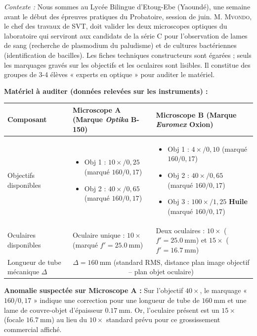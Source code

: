 \documentclass[11pt]{article}
\newcounter{popsec}
\newcounter{popsub}
\newcommand{\courssub}[1]{%
  \stepcounter{popsub}%
  \par\vspace{9pt}\noindent{\popxbold\fontsize{11.5}{13}\selectfont\color{popink}{\color{poporange}\thepopsec.\thepopsub}\hspace{6pt}#1}\par\nopagebreak\vspace{4pt}
}
\begin{document}
\courssub{Situation}
\emph{Contexte :} Nous sommes au Lycée Bilingue d'Etoug-Ebe (Yaoundé), une semaine avant le début des épreuves pratiques du Probatoire, session de juin. M. \textsc{Mvondo}, le chef des travaux de SVT, doit valider les deux microscopes optiques du laboratoire qui serviront aux candidats de la série C pour l'observation de lames de sang (recherche de plasmodium du paludisme) et de cultures bactériennes (identification de bacilles). Les fiches techniques constructeurs sont égarées ; seuls les marquages gravés sur les objectifs et les oculaires sont lisibles. Il constitue des groupes de 3-4 élèves « experts en optique » pour auditer le matériel.

\medskip
\noindent \textbf{Matériel à auditer (données relevées sur les instruments) :}
\begin{center}
\begin{tabularx}{\linewidth}{|l|X|X|}\hline
\textbf{Composant} & \textbf{Microscope A (Marque \emph{Optika} B-150)} & \textbf{Microscope B (Marque \emph{Euromex} Oxion)} \\ \hline
Objectifs disponibles & \begin{itemize}\item Obj 1 : $10\times / 0,25$ (marqué $160/0,17$)\item Obj 2 : $40\times / 0,65$ (marqué $160/0,17$)\end{itemize} & \begin{itemize}\item Obj 1 : $4\times / 0,10$ (marqué $160/0,17$)\item Obj 2 : $40\times / 0,65$ (marqué $160/0,17$)\item Obj 3 : $100\times / 1,25$ \textbf{Huile} (marqué $160/0,17$)\end{itemize} \\ \hline
Oculaires disponibles & Oculaire unique : \textbf{$10\times$} (marqué $f' = \SI{25,0}{\mm}$) & Deux oculaires : \textbf{$10\times$} ($f' = \SI{25,0}{\mm}$) et \textbf{$15\times$} ($f' = \SI{16,7}{\mm}$) \\ \hline
Longueur de tube mécanique $\Delta$ & \multicolumn{2}{c|}{$\Delta = \SI{160}{\mm}$ (standard RMS, distance plan image objectif -- plan objet oculaire)} \\ \hline
\end{tabularx}
\end{center}

\medskip
\noindent \textbf{Anomalie suspectée sur Microscope A :} Sur l'objectif $40\times$, le marquage « $160/0,17$ » indique une correction pour une longueur de tube de $\SI{160}{\mm}$ et une lame de couvre-objet d'épaisseur $\SI{0,17}{\mm}$. Or, l'oculaire présent est un $15\times$ (focale $\SI{16,7}{\mm}$) au lieu du $10\times$ standard prévu pour ce grossissement commercial affiché.
\end{document}
